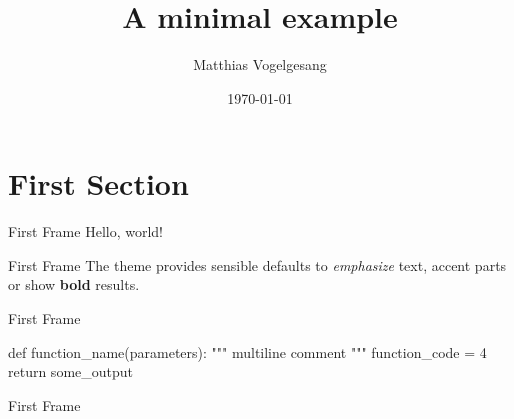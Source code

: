 \documentclass{beamer}
\title{A minimal example}
\date{\today}
\author{Matthias Vogelgesang}
\institute{Centre for Modern Beamer Themes}
\begin{document}
\maketitle

\section{First Section}

\begin{frame}{First Frame}
Hello, world! \cite{Finlayson_Chung_Kohane_Beam_2018}
\end{frame}

\begin{frame}{First Frame}
The theme provides sensible defaults to
\emph{emphasize} text, \alert{accent} parts
or show \textbf{bold} results.
\end{frame}

\begin{frame}[fragile]{First Frame}
    \begin{SourceCode}
    def function_name(parameters):
        """
        multiline comment
        """
        function_code = 4
        return some_output
    \end{SourceCode}

\end{frame}

\begin{frame}{First Frame}
    \printbibliography
\end{frame}
\end{document}
